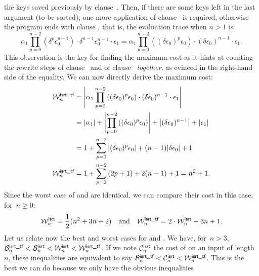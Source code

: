 the keys saved previously by clause~\clause{\delta}. Then, if there
are some keys left in the last argument (to be sorted), one more
application of clause~ is required, otherwise
the program ends with clause , that is, the
evaluation trace when \(n>1\) is
\begin{equation*}
\alpha_1\prod_{p=0}^{n-2}{\left(\delta^p\epsilon_0^{p+1}\right)} \cdot
\delta^{n-1}\epsilon_0^{n-1} \cdot \epsilon_1
= \alpha_1\prod_{p=0}^{n-2}{\left((\delta\epsilon_0)^p\epsilon_0\right)}
\cdot (\delta\epsilon_0)^{n-1} \cdot \epsilon_1.
\end{equation*}
This observation is the key for finding the maximum cost as it hints at counting the rewrite steps of clause~\clause{\delta} and of clause~
\emph{together}, as evinced in the right\hyp{}hand side of the
equality. We can now directly derive the maximum cost:
\begin{align*}
  \W{\fun{isrt\_tf}}{n}
  &= \left|\alpha_1\prod_{p=0}^{n-2}{\left((\delta\epsilon_0)^p\epsilon_0\right)}
     \cdot (\delta\epsilon_0)^{n-1} \cdot \epsilon_1\right|\\
  &= \len{\alpha_1} +
     \left|\prod_{p=0}^{n-2}{\left((\delta\epsilon_0)^p\epsilon_0\right)}\right|
     + \left|(\delta\epsilon_0)^{n-1}\right| + \len{\epsilon_1}\\
  &= 1 + \sum_{p=0}^{n-2}{\left|(\delta\epsilon_0)^p\epsilon_0\right|}
     + (n-1)\len{\delta\epsilon_0} + 1\\
\W{\fun{isrt\_tf}}{n}
  &= 1 + \sum_{p=0}^{n-2}{(2p+1)} + 2(n-1) + 1 = n^2 + 1.
\end{align*}
Since the worst case of  and  are
identical, we can compare their cost in this case,
for~\(n\geqslant{}0\):
\begin{equation*}
\W{\fun{isrt}}{n}     = \frac{1}{2}(n^2 + 3n + 2)\quad\text{and}\quad
\W{\fun{isrt\_tf}}{n} = 2 \cdot \W{\fun{isrt}}{n} + 3n + 1.
\end{equation*}
Let us relate now the best and worst cases for  and
. We have, for~\(n>3\),
\(\B{\smash[t]{\fun{isrt\_tf}}}{n} < \B{\fun{isrt}}{n} <
\W{\fun{isrt}}{n} < \W{\smash[t]{\fun{isrt\_tf}}}{n}\).  If we note
\(\C{\fun{isrt}}{n}\) the cost of  on an input of
length~\(n\), these inequalities are equivalent to say
\(\B{\smash[t]{\fun{isrt\_tf}}}{n} < \C{\fun{isrt}}{n} <
\W{\smash[t]{\fun{isrt\_tf}}}{n}\).  This is the best we can do
because we only have the obvious inequalities
